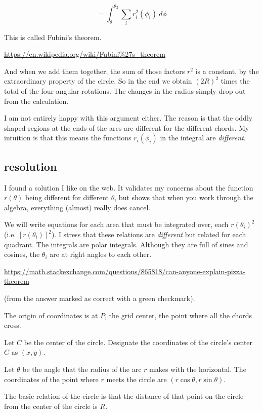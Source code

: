 \documentclass[11pt, oneside]{article}
\begin{document}
\[ = \int_{\theta_1}^{\theta_2}  \sum_i  r_i^2 (\phi_i) \ d \phi \]

This is called Fubini's theorem.

\url{https://en.wikipedia.org/wiki/Fubini%27s_theorem}

And when we add them together, the sum of those factors $r^2$ is a constant, by the extraordinary property of the circle.  So in the end we obtain $(2R)^2$ times the total of the four angular rotations.  The changes in the radius simply drop out from the calculation.

I am not entirely happy with this argument either.  The reason is that the oddly shaped regions at the ends of the arcs are different for the different chords.  My intuition is that this means the functions $r_i (\phi_i)$ in the integral are \emph{different}.

\subsection*{resolution}

I found a solution I like on the web.  It validates my concerns about the function $r(\theta)$ being different for different $\theta$, but shows that when you work through the algebra, everything (almost) really does cancel.

We will write equations for each area that must be integrated over, each $r(\theta_i)^2$ (i.e. $[r(\theta_i)]^2$).  I stress that these relations are \emph{different} but related for each quadrant.  The integrals are polar integrals.  Although they are full of sines and cosines, the $\theta_i$ are at right angles to each other.

\url{https://math.stackexchange.com/questions/865818/can-anyone-explain-pizza-theorem}

(from the answer marked as correct with a green checkmark).

The origin of coordinates is  at $P$, the grid center, the point where all the chords cross.

Let $C$ be the center of the circle.  Designate the coordinates of the circle's center $C$ as $(x, y)$.

Let $\theta$ be the angle that the radius of the arc $r$ makes with the horizontal.  The coordinates of the point where $r$ meets the circle are $( r \cos \theta, r \sin \theta)$.  

The basic relation of the circle is that the distance of that point on the circle from the center of the circle is $R$.  
\end{document}

